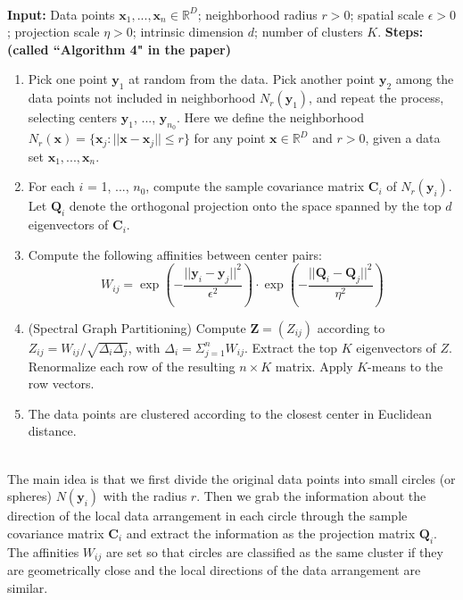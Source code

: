 \noindent\hrulefill\\
\textbf{Input:} \newline
Data points $\boldsymbol{x}_1, ..., \boldsymbol{x}_n \in \mathbb{R}^D$; neighborhood radius $r>0$; spatial scale $\epsilon>0$; projection scale $\eta>0$; intrinsic dimension $d$; number of clusters $K$. \vspace{0.1in} \newline
\textbf{Steps:  (called ``Algorithm 4" in the paper)}
\begin{enumerate}
\item Pick one point $\boldsymbol{y}_1$ at random from the data.
Pick another point $\boldsymbol{y}_2$ among the data points not included in neighborhood $N_r(\boldsymbol{y}_1)$, and repeat the process, selecting centers $\boldsymbol{y}_1$, ..., $\boldsymbol{y}_{n_0}$.
Here we define the neighborhood $N_r(\boldsymbol{x})=\{\boldsymbol{x}_j : ||\boldsymbol{x}-\boldsymbol{x}_j|| \leqslant r\}$ for any point $\boldsymbol{x} \in \mathbb{R}^D$ and $r>0$, given a data set $\boldsymbol{x}_1, ..., \boldsymbol{x}_n$.
\item For each $i$ = 1, ..., $n_0$, compute the sample covariance matrix $\boldsymbol{C}_i$ of $N_r(\boldsymbol{y}_i)$.
Let $\boldsymbol{Q}_i$ denote the orthogonal projection onto the space spanned by the top $d$ eigenvectors of $\boldsymbol{C}_i$.
\item Compute the following affinities between center pairs:
\begin{equation}
W_{ij}=\exp \left( -\frac{||\boldsymbol{y}_i-\boldsymbol{y}_j||^2}{\epsilon^2} \right) \cdot \exp \left(-\frac{||\boldsymbol{Q}_i-\boldsymbol{Q}_j||^2}{\eta^2} \right)
\end{equation}
\item (Spectral Graph Partitioning) Compute $\boldsymbol{Z} = (Z_{ij})$ according to $Z_{ij} = W_{ij}/\sqrt{\Delta_i \Delta_j}$, with $\Delta_i=\Sigma_{j=1}^{n} W_{ij}$.
Extract the top $K$ eigenvectors of $Z$.
Renormalize each row of the resulting $n \times K$ matrix.
Apply $K$-means to the row vectors.
\item The data points are clustered according to the closest center in Euclidean distance.
\end{enumerate}
\noindent\hrulefill\\

The main idea is that we first divide the original data points into small circles (or spheres) $N(\boldsymbol{y}_i)$ with the radius $r$.
Then we grab the information about the direction of the local data arrangement in each circle through the sample covariance matrix $\boldsymbol{C}_i$ and extract the information as the projection matrix $\boldsymbol{Q}_i$.
The affinities $W_{ij}$ are set so that circles are classified as the same cluster if they are geometrically close and the local directions of the data arrangement are similar.



